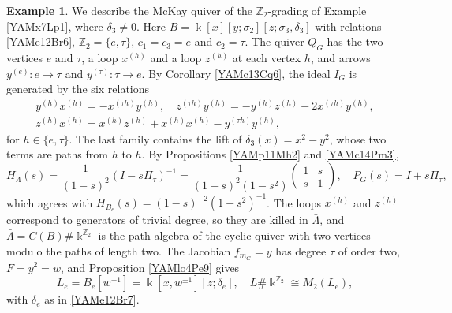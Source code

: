\documentclass[reqno]{amsart}
\numberwithin{equation}{section}
\theoremstyle{definition}
\newtheorem{example}[equation]{Example}
\theoremstyle{remark}
\theoremstyle{plain}
\newcommand{\kk}{\Bbbk}
\begin{document}
\begin{example}\label{YAMex19Qd6}
We describe the McKay quiver of the $\mathbb Z_2$-grading of Example \ref{YAMx7Lp1}, where $\delta_3\neq0$. Here $B=\kk[x][y;\sigma_2][z;\sigma_3,\delta_3]$ with relations \eqref{YAMe12Br6}, $\mathbb Z_2=\{e,\tau\}$, $c_1=c_3=e$ and $c_2=\tau$. The quiver $Q_G$ has the two vertices $e$ and $\tau$, a loop $x^{(h)}$ and a loop $z^{(h)}$ at each vertex $h$, and arrows $y^{(e)}\colon e\to\tau$ and $y^{(\tau)}\colon\tau\to e$. By Corollary \ref{YAMc13Cq6}, the ideal $I_G$ is generated by the six relations
\begin{gather*}
y^{(h)}x^{(h)}=-x^{(\tau h)}y^{(h)},\quad z^{(\tau h)}y^{(h)}=-y^{(h)}z^{(h)}-2x^{(\tau h)}y^{(h)},\\
z^{(h)}x^{(h)}=x^{(h)}z^{(h)}+x^{(h)}x^{(h)}-y^{(\tau h)}y^{(h)},
\end{gather*}
for $h\in\{e,\tau\}$. The last family contains the lift of $\delta_3(x)=x^2-y^2$, whose two terms are paths from $h$ to $h$. By Propositions \ref{YAMp11Mh2} and \ref{YAMc14Pm3},
\[
H_\Lambda(s)=\frac{1}{(1-s)^2}(I-s\Pi_\tau)^{-1}=\frac{1}{(1-s)^2(1-s^2)}\begin{pmatrix}1&s\\s&1\end{pmatrix},\quad P_G(s)=I+s\Pi_\tau,
\]
which agrees with $H_{B_e}(s)=(1-s)^{-2}(1-s^2)^{-1}$. The loops $x^{(h)}$ and $z^{(h)}$ correspond to generators of trivial degree, so they are killed in $\bar\Lambda$, and $\bar\Lambda=C(B)\#\kk^{\mathbb Z_2}$ is the path algebra of the cyclic quiver with two vertices modulo the paths of length two. The Jacobian $f_{m_G}=y$ has degree $\tau$ of order two, $F=y^2=w$, and Proposition \ref{YAMlo4Pe9} gives
\[
L_e=B_e[w^{-1}]=\kk[x,w^{\pm1}][z;\delta_e],\quad L\#\kk^{\mathbb Z_2}\cong M_2(L_e),
\]
with $\delta_e$ as in \eqref{YAMe12Br7}.
\end{example}
\end{document}
